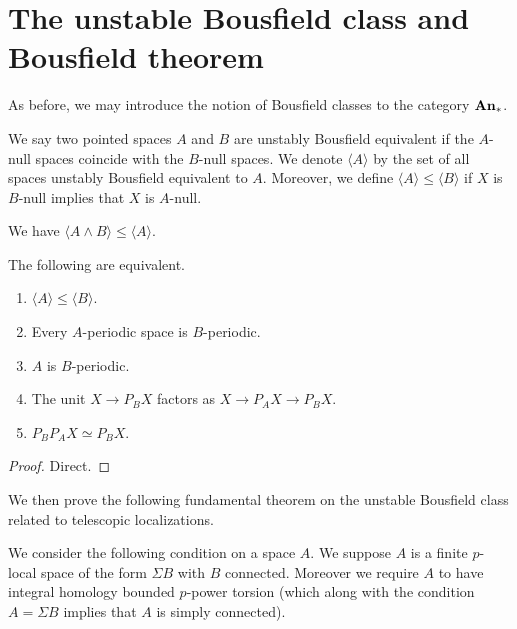 \section{The unstable Bousfield class and Bousfield theorem}

	As before, we may introduce the notion of Bousfield classes to the category $\mathbf{An}_*$. 
	
	\begin{defn}\label{Unstable_Bousfield_class}
		We say two pointed spaces $A$ and $B$ are unstably Bousfield equivalent if the $A$-null spaces coincide with the $B$-null spaces. We denote $\langle A\rangle$ by the set of all spaces unstably Bousfield equivalent to $A$. Moreover, we define $\langle A\rangle\leq\langle B\rangle$ if $X$ is $B$-null implies that $X$ is $A$-null. 
	\end{defn}

	\begin{coro}
		We have $\langle A\wedge B\rangle\leq\langle A\rangle$. 
	\end{coro}

	\begin{lemma}\label{Equiv_Bousfield_class_cond}
		The following are equivalent. 
		\begin{enumerate}
			\item $\langle A\rangle\leq\langle B\rangle$.
			\item Every $A$-periodic space is $B$-periodic. 
			\item $A$ is $B$-periodic. 
			\item The unit $X\to P_BX$ factors as $X\to P_AX\to P_BX$. 
			\item $P_BP_AX\simeq P_BX$. 
		\end{enumerate}
	\end{lemma}
	\begin{proof}
		Direct. 
	\end{proof}

	We then prove the following fundamental theorem on the unstable Bousfield class related to telescopic localizations. 

	\begin{cond}\label{Cond_type_loc}
		We consider the following condition on a space $A$. We suppose $A$ is a finite $p$-local space of the form $\Sigma B$ with $B$ connected. Moreover we require $A$ to have integral homology bounded $p$-power torsion (which along with the condition $A=\Sigma B$ implies that $A$ is simply connected). 
	\end{cond}
	
